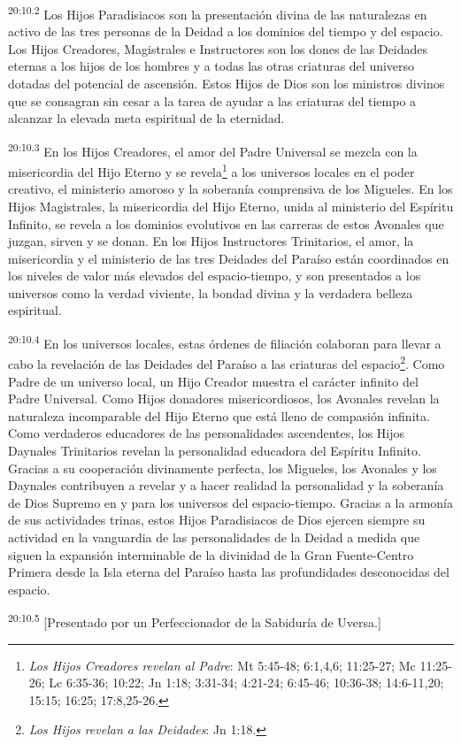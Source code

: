 \par
\textsuperscript{20:10.2} Los Hijos Paradisiacos son la presentación divina de las naturalezas en activo de las tres personas de la Deidad a los dominios del tiempo y del espacio. Los Hijos Creadores, Magistrales e Instructores son los dones de las Deidades eternas a los hijos de los hombres y a todas las otras criaturas del universo dotadas del potencial de ascensión. Estos Hijos de Dios son los ministros divinos que se consagran sin cesar a la tarea de ayudar a las criaturas del tiempo a alcanzar la elevada meta espiritual de la eternidad.

\par
\textsuperscript{20:10.3} En los Hijos Creadores, el amor del Padre Universal se mezcla con la misericordia del Hijo Eterno y se revela\footnote{\textit{Los Hijos Creadores revelan al Padre}: Mt 5:45-48; 6:1,4,6; 11:25-27; Mc 11:25-26; Lc 6:35-36; 10:22; Jn 1:18; 3:31-34; 4:21-24; 6:45-46; 10:36-38; 14:6-11,20; 15:15; 16:25; 17:8,25-26.} a los universos locales en el poder creativo, el ministerio amoroso y la soberanía comprensiva de los Migueles. En los Hijos Magistrales, la misericordia del Hijo Eterno, unida al ministerio del Espíritu Infinito, se revela a los dominios evolutivos en las carreras de estos Avonales que juzgan, sirven y se donan. En los Hijos Instructores Trinitarios, el amor, la misericordia y el ministerio de las tres Deidades del Paraíso están coordinados en los niveles de valor más elevados del espacio-tiempo, y son presentados a los universos como la verdad viviente, la bondad divina y la verdadera belleza espiritual.

\par
\textsuperscript{20:10.4} En los universos locales, estas órdenes de filiación colaboran para llevar a cabo la revelación de las Deidades del Paraíso a las criaturas del espacio\footnote{\textit{Los Hijos revelan a las Deidades}: Jn 1:18.}. Como Padre de un universo local, un Hijo Creador muestra el carácter infinito del Padre Universal. Como Hijos donadores misericordiosos, los Avonales revelan la naturaleza incomparable del Hijo Eterno que está lleno de compasión infinita. Como verdaderos educadores de las personalidades ascendentes, los Hijos Daynales Trinitarios revelan la personalidad educadora del Espíritu Infinito. Gracias a su cooperación divinamente perfecta, los Migueles, los Avonales y los Daynales contribuyen a revelar y a hacer realidad la personalidad y la soberanía de Dios Supremo en y para los universos del espacio-tiempo. Gracias a la armonía de sus actividades trinas, estos Hijos Paradisiacos de Dios ejercen siempre su actividad en la vanguardia de las personalidades de la Deidad a medida que siguen la expansión interminable de la divinidad de la Gran Fuente-Centro Primera desde la Isla eterna del Paraíso hasta las profundidades desconocidas del espacio.

\par
\textsuperscript{20:10.5} [Presentado por un Perfeccionador de la Sabiduría de Uversa.]